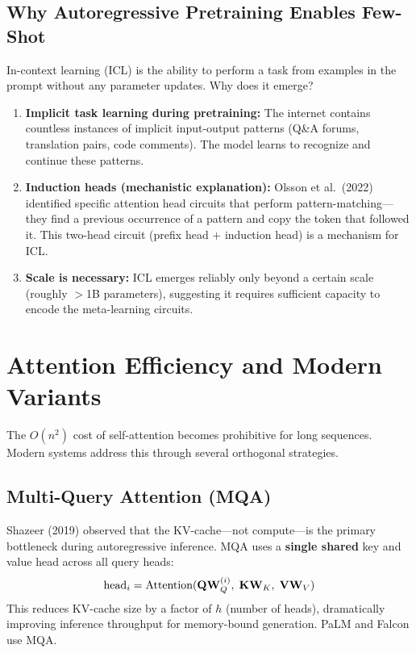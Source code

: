 \subsection{Why Autoregressive Pretraining Enables Few-Shot}

In-context learning (ICL) is the ability to perform a task from examples in
the prompt without any parameter updates.  Why does it emerge?

\begin{enumerate}
    \item \textbf{Implicit task learning during pretraining:} The internet
          contains countless instances of implicit input-output patterns
          (Q\&A forums, translation pairs, code comments).  The model learns
          to recognize and continue these patterns.
    \item \textbf{Induction heads (mechanistic explanation):} Olsson et al.\
          (2022) identified specific attention head circuits that perform
          pattern-matching---they find a previous occurrence of a pattern and
          copy the token that followed it.  This two-head circuit (prefix head
          + induction head) is a mechanism for ICL.
    \item \textbf{Scale is necessary:} ICL emerges reliably only beyond a
          certain scale (roughly $>$1B parameters), suggesting it requires
          sufficient capacity to encode the meta-learning circuits.
\end{enumerate}


\section{Attention Efficiency and Modern Variants}
\label{sec:attention-efficiency}

The $O(n^2)$ cost of self-attention becomes prohibitive for long sequences.
Modern systems address this through several orthogonal strategies.

\subsection{Multi-Query Attention (MQA)}

Shazeer (2019) observed that the KV-cache---not compute---is the primary
bottleneck during autoregressive inference.  MQA uses a \textbf{single shared}
key and value head across all query heads:
\[
    \text{head}_i = \text{Attention}(\mathbf{Q} \mathbf{W}_Q^{(i)},\; \mathbf{K} \mathbf{W}_K,\; \mathbf{V} \mathbf{W}_V)
\]
This reduces KV-cache size by a factor of $h$ (number of heads), dramatically
improving inference throughput for memory-bound generation.  PaLM and Falcon
use MQA.


